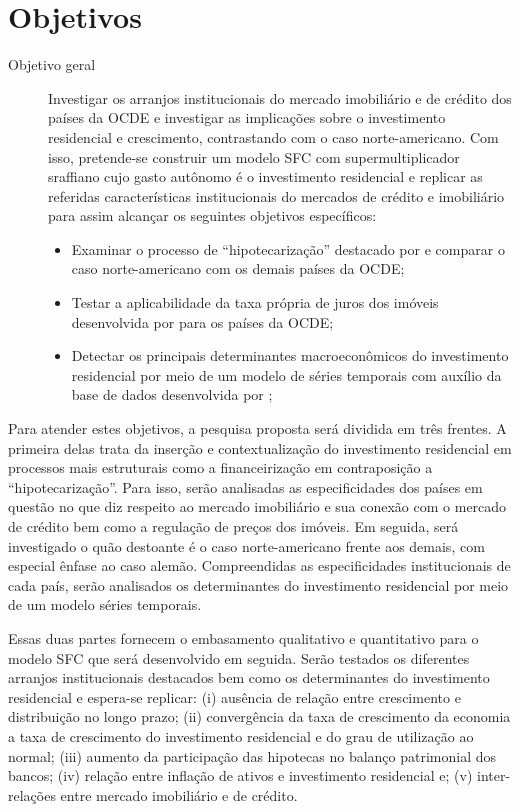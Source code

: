 \section{Objetivos}\label{OBJ}

\begin{description}
	\item[Objetivo geral] Investigar os arranjos institucionais do mercado imobiliário e de crédito dos países da OCDE e investigar as implicações sobre o investimento residencial e crescimento, contrastando com o caso norte-americano. Com isso, pretende-se construir um modelo SFC com supermultiplicador sraffiano cujo gasto autônomo é o investimento residencial e replicar as referidas características institucionais do mercados de crédito e imobiliário para assim alcançar os seguintes objetivos específicos:
	\begin{itemize}
		\item Examinar o processo de ``hipotecarização'' destacado por \textcite{jorda_great_2014} e comparar o caso norte-americano com os demais países da OCDE;
		\item Testar a aplicabilidade da taxa própria de juros dos imóveis desenvolvida por \textcite{teixeira_crescimento_2015} para os países da OCDE; 
		\item Detectar os principais determinantes macroeconômicos do investimento residencial por meio de um modelo de séries temporais com auxílio da base de dados desenvolvida por \textcite{jorda_great_2014};
	\end{itemize}
\end{description}


Para atender estes objetivos, a pesquisa proposta será dividida em três frentes.
A primeira delas trata da inserção e contextualização do investimento residencial em processos mais estruturais como a financeirização em contraposição a ``hipotecarização''. Para isso, serão analisadas as especificidades dos países em questão no que diz respeito ao mercado imobiliário e sua conexão com o mercado de crédito bem como a regulação de preços dos imóveis. Em seguida, será investigado o quão destoante é o caso norte-americano frente aos demais, com especial ênfase ao caso alemão. Compreendidas as especificidades institucionais de cada país, serão analisados os determinantes do investimento residencial por meio de um modelo séries temporais. 

Essas duas partes fornecem o embasamento qualitativo e quantitativo para o modelo SFC que será desenvolvido em seguida. Serão testados os diferentes arranjos institucionais destacados bem como os determinantes do investimento residencial e espera-se replicar: 
	(i) ausência de relação entre crescimento e distribuição no longo prazo; 
	(ii) convergência da taxa de crescimento da economia a taxa de crescimento do investimento residencial e do grau de utilização ao normal; 
	(iii) aumento da participação das hipotecas no balanço patrimonial dos bancos;
	(iv) relação entre inflação de ativos e investimento residencial e; 
	(v) inter-relações entre mercado imobiliário e de crédito. 


